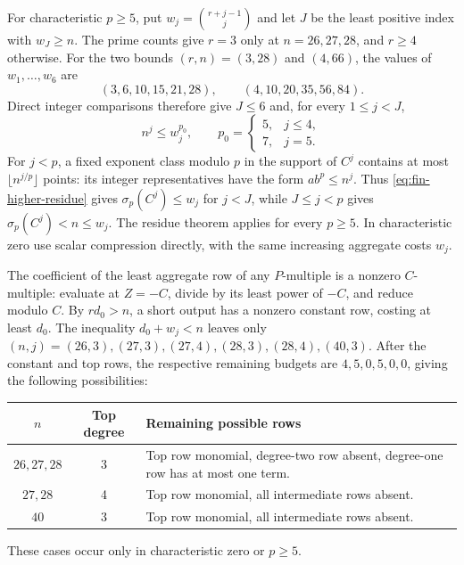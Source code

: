 \documentclass[11pt]{article}
\numberwithin{equation}{section}
\theoremstyle{definition}\newtheorem{definition}[theorem]{Definition}
\theoremstyle{remark}\newtheorem{remark}[theorem]{Remark}
\begin{document}
For characteristic $p\ge5$, put $w_j=\binom{r+j-1}{j}$ and let $J$ be
the least positive index with $w_J\ge n$. The prime counts give $r=3$
only at $n=26,27,28$, and $r\ge4$ otherwise. For the two bounds
$(r,n)=(3,28)$ and $(4,66)$, the values of $w_1,\ldots,w_6$ are
\[
 (3,6,10,15,21,28),\qquad (4,10,20,35,56,84).
\]
Direct integer comparisons therefore give $J\le6$ and, for every
$1\le j<J$,
\begin{equation}\label{eq:fin-higher-residue}
 n^j\le w_j^{p_0},\qquad
 p_0=\begin{cases}5,&j\le4,\\7,&j=5.\end{cases}
\end{equation}
For $j<p$, a fixed exponent class modulo $p$ in the support of $C^j$
contains at most $\lfloor n^{j/p}\rfloor$ points: its integer
representatives have the form $a b^p\le n^j$. Thus
\eqref{eq:fin-higher-residue} gives $\sigma_p(C^j)\le w_j$ for $j<J$,
while $J\le j<p$ gives $\sigma_p(C^j)<n\le w_j$.
The residue theorem applies for every $p\ge5$.
In characteristic zero use scalar compression directly, with the same
increasing aggregate costs $w_j$.

The coefficient of the least aggregate row of any $P$-multiple is a
nonzero $C$-multiple: evaluate at $Z=-C$, divide by its least power of
$-C$, and reduce modulo $C$. By $rd_0>n$, a short output has a nonzero
constant row, costing at least $d_0$.
The inequality $d_0+w_j<n$ leaves only
$(n,j)=(26,3),(27,3),(27,4),(28,3),(28,4),(40,3)$.
After the constant and top rows, the respective remaining budgets
are $4,5,0,5,0,0$, giving the following possibilities:
\begin{center}
\begin{tabular}{c|c|>{\raggedright\arraybackslash}p{82mm}}
$n$&Top degree&Remaining possible rows\\\hline
$26,27,28$&3&Top row monomial, degree-two row absent, degree-one row
has at most one term.\\
$27,28$&4&Top row monomial, all intermediate rows absent.\\
$40$&3&Top row monomial, all intermediate rows absent.
\end{tabular}
\end{center}
These cases occur only in characteristic zero or $p\ge5$.
\end{document}
